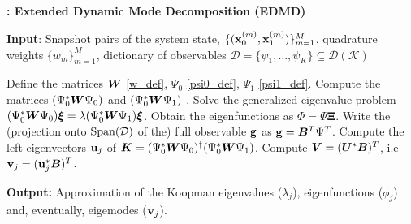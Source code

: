 \begin{algorithm}
\caption{\textbf{: Extended Dynamic Mode Decomposition (EDMD)}}
\label{alg_edmd}
\textbf{Input}: Snapshot pairs of the system state, $\{(\vb{x}_0^{(m)}, \vb{x}_1^{(m)})\}_{m = 1}^M$, quadrature weights $\{w_m\}_{m = 1}^M$, dictionary of observables $\mathcal{D} = \{\psi_1, \dots, \psi_K\} \subseteq \mathcal{D}(\mathcal{K})$
\begin{algorithmic}[1]
\State Define the matrices $\vb*{W}$ \eqref{w_def}, $\Psi_0$ \eqref{psi0_def}, $\Psi_1$ \eqref{psi1_def}. 
\State Compute the matrices $(\Psi_0^*\vb*{W}\Psi_0)$ and $(\Psi_0^*\vb*{W}\Psi_1)$ .
\State Solve the generalized eigenvalue problem $(\Psi_0^*\vb*{W}\Psi_0)\bm{\xi} = \lambda(\Psi_0^*\vb*{W}\Psi_1)\bm{\xi}$.
\State Obtain the eigenfunctions as $\Phi = \Psi\bm{\Xi}$.
    \State Write the (projection onto $\mathrm{Span}(\mathcal{D})$ of the) full observable $\vb{g}$ as $\vb{g} = \vb*{B}^T\Psi^T$.
    \State Compute the left eigenvectors $\vb{u}_j$ of $\vb*{K} = (\Psi_0^*\vb*{W}\Psi_0)^{\dagger}(\Psi_0^*\vb*{W}\Psi_1)$.
    \State Compute $\vb*{V} = (\vb*{U}^*\vb*{B})^T$, i.e $\vb{v}_j = (\vb{u}_j^*\vb*{B})^T$.
\EndIf
\end{algorithmic}
\textbf{Output:} Approximation of the Koopman eigenvalues ($\lambda_j$), eigenfunctions ($\phi_j$) and, eventually, eigemodes ($\vb{v}_j$).
\end{algorithm}


